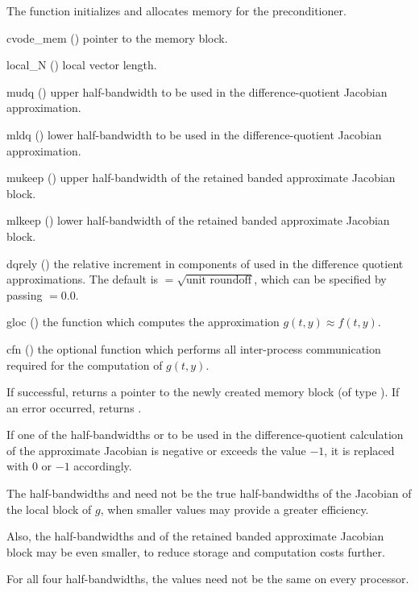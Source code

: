 {
  The function  initializes and allocates
  memory for the {\cvbbdpre} preconditioner.
}
{
  \begin{args}
  \item[cvode\_mem] ()
    pointer to the {\cvode} memory block.
  \item[local\_N] ()
    local vector length.
  \item[mudq] ()
    upper half-bandwidth to be used in the difference-quotient Jacobian approximation.
  \item[mldq] ()
    lower half-bandwidth to be used in the difference-quotient Jacobian approximation.
  \item[mukeep] ()
    upper half-bandwidth of the retained banded approximate Jacobian block.
  \item[mlkeep] ()
    lower half-bandwidth of the retained banded approximate Jacobian block.
  \item[dqrely] ()
    the relative increment in components of  used in the difference quotient
    approximations.  The default is $ = \sqrt{\text{unit roundoff}}$,
    which can be specified by passing $ = 0.0$.
  \item[gloc] ()
    the {\C} function which computes the approximation $g(t,y) \approx f(t,y)$. 
  \item[cfn] ()
    the optional {\C} function which performs all inter-process communication required for
    the computation of $g(t,y)$.
  \end{args}
}
{
  If successful,  returns a pointer to the newly created 
  {\cvbbdpre} memory block (of type ).
  If an error occurred,  returns .
}
{
  If one of the half-bandwidths  or  to be used in the 
  difference-quotient calculation of the approximate Jacobian is negative or 
  exceeds the value $-1$, it is replaced with 0 or
  $-1$ accordingly.

  The half-bandwidths  and  need not be the true 
  half-bandwidths of the Jacobian of the local block of $g$,    
  when smaller values may provide a greater efficiency.       

  Also, the half-bandwidths  and  of the retained 
  banded approximate Jacobian block may be even smaller,      
  to reduce storage and computation costs further.            

  For all four half-bandwidths, the values need not be the    
  same on every processor.
}
